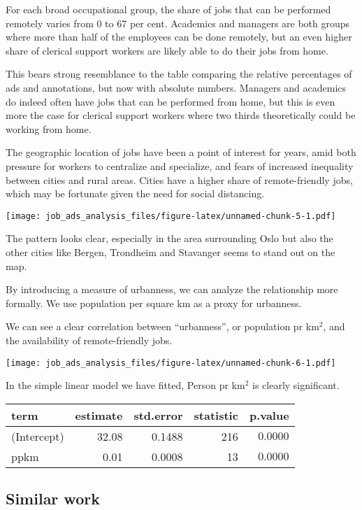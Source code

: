 \documentclass[]{article}
\begin{document}
For each broad occupational group, the share of jobs that can be
performed remotely varies from 0 to 67 per cent. Academics and managers
are both groups where more than half of the employees can be done
remotely, but an even higher share of clerical support workers are
likely able to do their jobs from home.

This bears strong resemblance to the table comparing the relative
percentages of ads and annotations, but now with absolute numbers.
Managers and academics do indeed often have jobs that can be performed
from home, but this is even more the case for clerical support workers
where two thirds theoretically could be working from home.

The geographic location of jobs have been a point of interest for years,
amid both pressure for workers to centralize and specialize, and fears
of increased inequality between cities and rural areas. Cities have a
higher share of remote-friendly jobs, which may be fortunate given the
need for social distancing.

\texttt{[image: job\_ads\_analysis\_files/figure-latex/unnamed-chunk-5-1.pdf]}

The pattern looks clear, especially in the area surrounding Oslo but
also the other cities like Bergen, Trondheim and Stavanger seems to
stand out on the map.

By introducing a measure of urbanness, we can analyze the relationship
more formally. We use population per square km as a proxy for urbanness.

We can see a clear correlation between ``urbanness'', or population pr
km\(^2\), and the availability of remote-friendly jobs.

\texttt{[image: job\_ads\_analysis\_files/figure-latex/unnamed-chunk-6-1.pdf]}

In the simple linear model we have fitted, Person pr km\(^2\) is clearly
significant.

\captionsetup[table]{labelformat=empty,skip=1pt}
\begin{longtable}{lrrrr}
\toprule
term & estimate & std.error & statistic & p.value \\ 
\midrule
(Intercept) & 32.08 & 0.1488 & 216 & $0.0000$ \\ 
ppkm & 0.01 & 0.0008 & 13 & $0.0000$ \\ 
\bottomrule
\end{longtable}

\hypertarget{similar-work}{%
\subsection{Similar work}\label{similar-work}}
\end{document}
